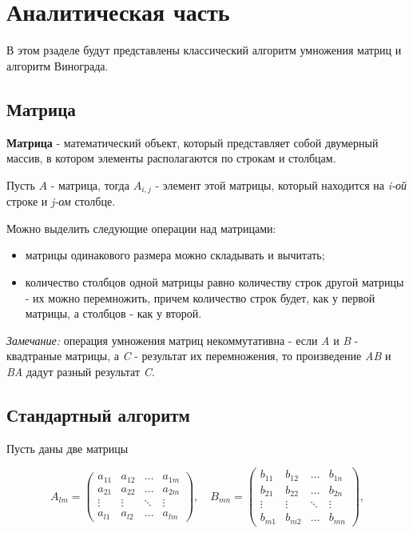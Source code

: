 \chapter{Аналитическая часть}
В этом рзаделе будут представлены классический алгоритм умножения матриц и алгоритм Винограда.


\section{Матрица}

\textbf{Матрица} \cite{matrix} - математический объект, который представляет собой двумерный массив, в котором элементы располагаются по строкам и столбцам.

Пусть $A$ - матрица, тогда $A_{i,j}$ - элемент этой матрицы, который находится на \textit{i-ой} строке и \textit{j-ом} столбце.

Можно выделить следующие операции над матрицами:
\begin{itemize}
    \item матрицы одинакового размера можно складывать и вычитать;
    \item количество столбцов одной матрицы равно количеству строк другой матрицы - их можно перемножить, причем количество строк будет, как у первой матрицы, а столбцов - как у второй. \newline
\end{itemize}

\textit{Замечание:} операция умножения матриц некоммутативна - если \textit{A} и \textit{B} - квадтраные матрицы, а \textit{C} - результат их перемножения, то произведение \textit{AB} и \textit{BA} дадут разный результат \textit{C}.


\section{Стандартный алгоритм}

Пусть даны две матрицы

\begin{equation}
	A_{lm} = \begin{pmatrix}
		a_{11} & a_{12} & \ldots & a_{1m}\\
		a_{21} & a_{22} & \ldots & a_{2m}\\
		\vdots & \vdots & \ddots & \vdots\\
		a_{l1} & a_{l2} & \ldots & a_{lm}
	\end{pmatrix},
	\quad
	B_{mn} = \begin{pmatrix}
		b_{11} & b_{12} & \ldots & b_{1n}\\
		b_{21} & b_{22} & \ldots & b_{2n}\\
		\vdots & \vdots & \ddots & \vdots\\
		b_{m1} & b_{m2} & \ldots & b_{mn}
	\end{pmatrix},
\end{equation}

